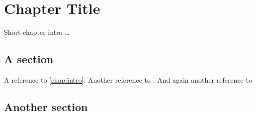 \chapter{Chapter Title}
\label{chap:title}

Short chapter intro \ldots

\section{A section}

A reference to \ref{chap:intro}.
Another reference to .
And again another reference to 



\section{Another section}

